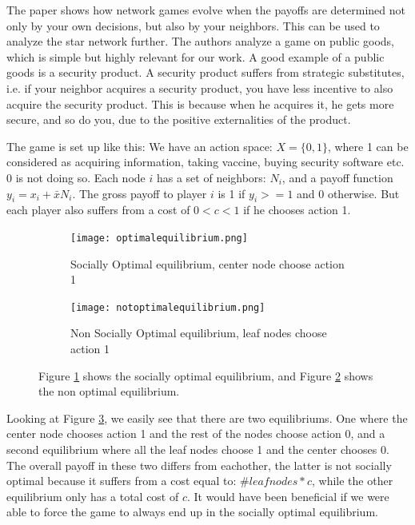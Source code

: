 The paper \cite{networkgames} shows how network games evolve when the payoffs are determined not only by your own decisions, but also by your neighbors. This can be used to analyze the star network further. The authors analyze a game on public goods, which is simple but highly relevant for our work. A good example of a public goods is a security product. A security product suffers from strategic substitutes, i.e. if your neighbor acquires a security product, you have less incentive to also acquire the security product. This is because when he acquires it, he gets more secure, and so do you, due to the positive externalities of the product.

The game is set up like this:
We have an action space: $X=\{0,1\}$, where 1 can be considered as acquiring information, taking vaccine, buying security software etc. 0 is not doing so.
Each node $i$ has a set of neighbors: $N_{i} $, and a payoff function $y_{i}=x_{i}+\bar{x}N_{i}$. 
The gross payoff to player $i$ is 1 if $y_{i}>=1$ and 0 otherwise. But each player also suffers from a cost of $0<c<1$ if he chooses action 1.
\begin{figure}[h]
\centering
\begin{subfigure}{.4\textwidth}
  \centering
  \texttt{[image: optimalequilibrium.png]}
  \caption{\label{fig:optequi} Socially Optimal equilibrium, center node choose action 1}
\end{subfigure}
\quad
\begin{subfigure}{.4\textwidth}
  \centering
  \texttt{[image: notoptimalequilibrium.png]}
  \caption{\label{fig:notoptequi} Non Socially Optimal equilibrium, leaf nodes choose action 1}
\end{subfigure}
\caption{\label{fig:starequi} Figure \ref{fig:optequi} shows the socially optimal equilibrium, and Figure \ref{fig:notoptequi} shows the non optimal equilibrium.}

\end{figure}
Looking at Figure \ref{fig:starequi}, we easily see that there are two equilibriums. One where the center node chooses action 1 and the rest of the nodes choose action 0, and a second equilibrium where all the leaf nodes choose 1 and the center chooses 0.
The overall payoff in these two differs from eachother, the latter is not socially optimal because it
 suffers from a cost equal to: $\#leaf nodes*c$, while the other equilibrium only has a total cost of $c$.
 It would have been beneficial if we were able to force the game to always end up in the socially optimal equilibrium.


